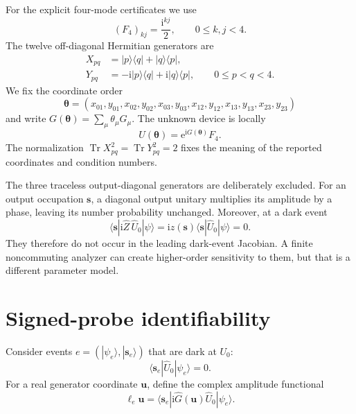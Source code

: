 \documentclass[aps,pra,reprint,amsmath,amssymb,superscriptaddress,longbibliography]{revtex4-2}
\newcommand{\ii}{\mathrm{i}}
\newcommand{\ee}{\mathrm{e}}
\newcommand{\Tr}{\operatorname{Tr}}
\newcommand{\btheta}{\bm{\theta}}
\newcommand{\Ffour}{F_4}
\begin{document}
For the explicit four-mode certificates we use
\begin{equation}
 (\Ffour)_{kj}=\frac{\ii^{kj}}2,\qquad 0\leq k,j<4.
\label{eq:f4}
\end{equation}
The twelve off-diagonal Hermitian generators are
\begin{align}
 X_{pq}&=|p\rangle\langle q|+|q\rangle\langle p|,\nonumber\\
 Y_{pq}&=-\ii|p\rangle\langle q|+\ii|q\rangle\langle p|,
 \qquad 0\leq p<q<4.
\label{eq:xy}
\end{align}
We fix the coordinate order
\begin{equation}
\btheta=(x_{01},y_{01},x_{02},y_{02},x_{03},y_{03},
x_{12},y_{12},x_{13},y_{13},x_{23},y_{23})
\label{eq:coordinate-order}
\end{equation}
and write $G(\btheta)=\sum_\mu\theta_\mu G_\mu$.  The unknown device is
locally
\begin{equation}
 U(\btheta)=\ee^{\ii G(\btheta)}\Ffour.
\label{eq:unknown-device}
\end{equation}
The normalization $\Tr X_{pq}^2=\Tr Y_{pq}^2=2$ fixes the meaning of the
reported coordinates and condition numbers.

The three traceless output-diagonal generators are deliberately excluded.
For an output occupation $\bm s$, a diagonal output unitary multiplies its
amplitude by a phase, leaving its number probability unchanged.  Moreover,
at a dark event
\begin{equation}
 \langle\bm s|\ii\widehat Z\,\widehat U_0|\psi\rangle
 =\ii z(\bm s)\langle\bm s|\widehat U_0|\psi\rangle=0 .
\label{eq:output-diagonal-zero}
\end{equation}
They therefore do not occur in the leading dark-event Jacobian.  A finite
noncommuting analyzer can create higher-order sensitivity to them, but that
is a different parameter model.

\section{Signed-probe identifiability}
\label{sec:signed-probe}

Consider events $e=(|\psi_e\rangle,|\bm s_e\rangle)$ that are dark at
$U_0$:
\begin{equation}
 \langle\bm s_e|\widehat U_0|\psi_e\rangle=0.
\label{eq:dark}
\end{equation}
For a real generator coordinate $\bm u$, define the complex amplitude
functional
\begin{equation}
 \ell_e\bm u
 =\langle\bm s_e|\ii\widehat G(\bm u)\widehat U_0|\psi_e\rangle .
\label{eq:ell}
\end{equation}
\end{document}
